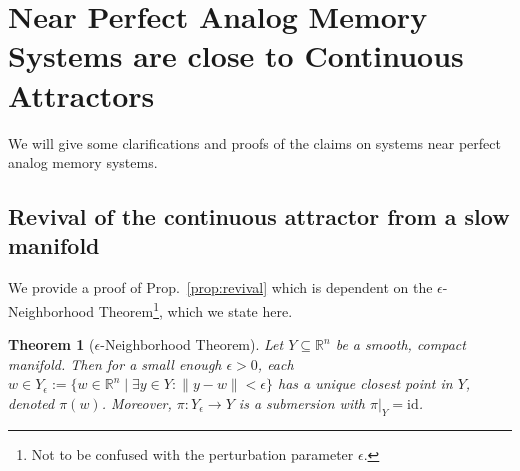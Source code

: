 \documentclass{article} %
\newcounter{ct}
\newtheorem{theorem}{Theorem}
\theoremstyle{definition}
\theoremstyle{remark}
\begin{document}
\newpage
\section{Near Perfect Analog Memory Systems are close to Continuous Attractors}
We will give some clarifications and proofs of the claims on systems near perfect analog memory systems.

\subsection{Revival of the continuous attractor from a slow manifold}\label{sec:supp:proofprop1}

We  provide a proof of Prop.~\ref{prop:revival} which is dependent on the \(\epsilon\)-Neighborhood Theorem\footnote{Not to be confused with the perturbation parameter \(\epsilon\).}, which we state here.

\begin{theorem}[\(\epsilon\)-Neighborhood Theorem\citep{guillemin2010differential}]
Let \( Y \subseteq \mathbb{R}^n \) be a smooth, compact manifold. Then for a small enough \(\epsilon > 0\),
each \( w \in Y_\epsilon := \{ w \in \mathbb{R}^n \mid \exists y \in Y : \|y - w\| < \epsilon \} \)
has a unique closest point in \( Y \), denoted \( \pi(w) \).
Moreover, \( \pi: Y_\epsilon \to Y \) is a submersion with \( \pi|_Y = \text{id} \).
\end{theorem}

\end{document}
